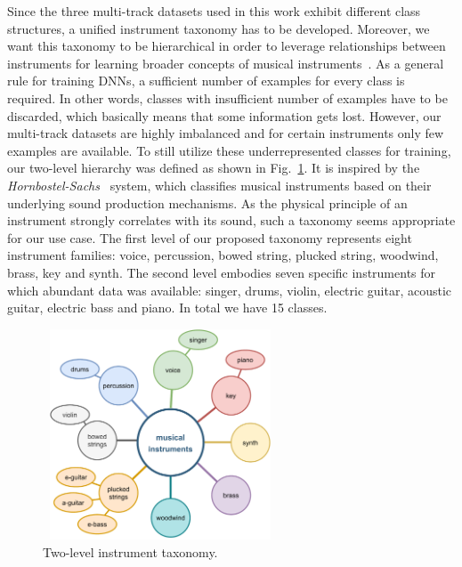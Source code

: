 \documentclass{article}
\begin{document}
Since the three multi-track datasets used in this work exhibit different class structures, a unified instrument taxonomy has to be developed. Moreover, we want this taxonomy to be hierarchical in order to leverage relationships between instruments for learning broader concepts of musical instruments~\cite{garcia2021leveraging}. As a general rule for training DNNs, a sufficient number of examples for every class is required. In other words, classes with insufficient number of examples have to be discarded, which basically means that some information gets lost. However, our multi-track datasets are highly imbalanced and for certain instruments only few examples are available. To still utilize these underrepresented classes for training, our two-level hierarchy was defined as shown in Fig.~\ref{fig:taxonomy}. It is inspired by the \textit{Hornbostel-Sachs}~\cite{hornbostel1914systematik} system, which classifies musical instruments based on their underlying sound production mechanisms. As the physical principle of an instrument strongly correlates with its sound, such a taxonomy seems appropriate for our use case. The first level of our proposed taxonomy represents eight instrument families: voice, percussion, bowed string, plucked string, woodwind, brass, key and synth. The second level embodies seven specific instruments for which abundant data was available: singer, drums, violin, electric guitar, acoustic guitar, electric bass and piano. In total we have 15 classes.
\begin{figure}[t]
	\begin{minipage}[b]{1.0\linewidth}
		\centering
		\centerline{\includegraphics[width=7.0cm,height=6.25cm]{instrument-taxonomy-only15classes.pdf}}
	\end{minipage}
	\centering
	\caption{Two-level instrument taxonomy.}
	\label{fig:taxonomy}
	\vspace*{-0.05cm}	
\end{figure}
\end{document}
